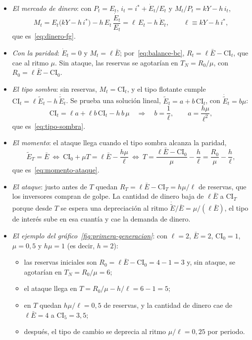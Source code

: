 \documentclass[11pt]{article}
\begin{document}
\begin{itemize}
\item \emph{El mercado de dinero}: con $P_t=E_t$, $i_t=i^*+\dot E_t/E_t$ y $M_t/P_t=kY-h\,i_t$,
  \[
  M_t=E_t\bigl(kY-h\,i^*\bigr)-h\,E_t\,\frac{\dot E_t}{E_t}=\ell\,E_t-h\,\dot E_t,\qquad \ell\equiv kY-h\,i^* ,
  \]
  que es~\eqref{eq:dinero-fg}.
\item \emph{Con la paridad}: $\dot E_t=0$ y $M_t=\ell\bar E$; por~\eqref{eq:balance-bc}, $R_t=\ell\bar E-\mathrm{CI}_t$, que cae al ritmo $\mu$. Sin ataque, las reservas se agotarían en $T_N=R_0/\mu$, con $R_0=\ell\bar E-\mathrm{CI}_0$.
\item \emph{El tipo sombra}: sin reservas, $M_t=\mathrm{CI}_t$, y el tipo flotante cumple $\mathrm{CI}_t=\ell\tilde E_t-h\,\dot{\tilde E}_t$. Se prueba una solución lineal, $\tilde E_t=a+b\,\mathrm{CI}_t$, con $\dot{\tilde E}_t=b\mu$:
  \[
  \mathrm{CI}_t=\ell a+\ell b\,\mathrm{CI}_t-h\,b\,\mu\quad\Longrightarrow\quad b=\frac1\ell,\qquad a=\frac{h\mu}{\ell^{2}},
  \]
  que es~\eqref{eq:tipo-sombra}.
\item \emph{El momento}: el ataque llega cuando el tipo sombra alcanza la paridad,
  \[
  \tilde E_T=\bar E\ \Longleftrightarrow\ \mathrm{CI}_0+\mu T=\ell\bar E-\frac{h\mu}{\ell}\ \Longleftrightarrow\ T=\frac{\ell\bar E-\mathrm{CI}_0}{\mu}-\frac{h}{\ell}=\frac{R_0}{\mu}-\frac{h}{\ell},
  \]
  que es~\eqref{eq:momento-ataque}.
\item \emph{El ataque}: justo antes de $T$ quedan $R_T=\ell\bar E-\mathrm{CI}_T=h\mu/\ell$ de reservas, que los inversores compran de golpe. La cantidad de dinero baja de $\ell\bar E$ a $\mathrm{CI}_T$ porque desde $T$ se espera una depreciación al ritmo $\dot{\tilde E}/\bar E=\mu/(\ell\bar E)$, el tipo de interés sube en esa cuantía y cae la demanda de dinero.
\item \emph{El ejemplo del gráfico~\ref{fig:primera-generacion}}: con $\ell=2$, $\bar E=2$, $\mathrm{CI}_0=1$, $\mu=0{,}5$ y $h\mu=1$ (es decir, $h=2$):
  \begin{itemize}
  \item las reservas iniciales son $R_0=\ell\bar E-\mathrm{CI}_0=4-1=3$ y, sin ataque, se agotarían en $T_N=R_0/\mu=6$;
  \item el ataque llega en $T=R_0/\mu-h/\ell=6-1=5$;
  \item en $T$ quedan $h\mu/\ell=0{,}5$ de reservas, y la cantidad de dinero cae de $\ell\bar E=4$ a $\mathrm{CI}_5=3{,}5$;
  \item después, el tipo de cambio se deprecia al ritmo $\mu/\ell=0{,}25$ por periodo. \findemo
  \end{itemize}
\end{itemize}
\end{document}
